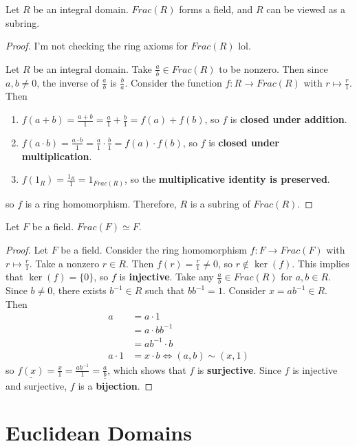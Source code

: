 \documentclass [12pt] {article}
\newenvironment{theorem}[1]{\begin{tcolorbox}[title={Theorem #1},colback=green!5!white,colframe=black!75!green]}{\end{tcolorbox}}
\newenvironment{corollary}[1]{\begin{tcolorbox}[title={Corollary #1}]}{\end{tcolorbox}}
\renewcommand{\bf}[1]{\textbf{{#1}}}
\newcommand{\ul}[1]{\underline{{#1}}}
\begin{document}
\begin{theorem}{}
    Let $R$ be an integral domain. $Frac(R)$ forms a field, and $R$ can be viewed as a subring.
\end{theorem}
\begin{proof}
    I'm not checking the ring axioms for $Frac(R)$ lol.
    \vspace{0.5em}

    Let $R$ be an integral domain. Take $\frac{a}{b} \in Frac(R)$ to be nonzero. Then since
    $a, b \neq 0$, the inverse of $\frac{a}{b}$ is $\frac{b}{a}$. Consider the function
    $f : R \to Frac(R)$ with $r \mapsto \frac{r}{1}$. Then
    \begin{enumerate}[label=(\arabic*)]
        \item $f(a + b) = \frac{a + b}{1} = \frac{a}{1} + \frac{b}{1} = f(a) + f(b)$, so $f$ is
            \bf{closed under addition}.
        \item $f(a \cdot b) = \frac{a \cdot b}{1} = \frac{a}{1} \cdot \frac{b}{1} = f(a) \cdot f(b)$,
            so $f$ is \bf{closed under multiplication}.
        \item $f(1_R) = \frac{1_R}{1} = 1_{Frac(R)}$, so the \bf{multiplicative identity is preserved}.
    \end{enumerate}
    so $f$ is a ring homomorphism. Therefore, $R$ is a subring of $Frac(R)$.
\end{proof}

\begin{corollary}{}
    Let $F$ be a field. $Frac(F) \simeq F$.
\end{corollary}
\begin{proof}
    Let $F$ be a field. Consider the ring homomorphism $f : F \to Frac(F)$ with $r \mapsto \frac{r}{1}$.
    Take a nonzero $r \in R$. Then $f(r) = \frac{r}{1} \neq 0$, so
    $r \not \in \ker(f)$. This implies that $\ker(f) = \{ 0 \}$, so $f$ is \bf{injective}. Take any
    $\frac{a}{b} \in Frac(R)$ for $a, b \in R$. Since $b \neq 0$, there exists $b^{-1} \in R$ such
    that $bb^{-1} = 1$. Consider $x = ab^{-1} \in R$. Then
    \begin{align*}
        a &= a \cdot 1 \\
          &= a \cdot bb^{-1} \\
          &= ab^{-1} \cdot b \\
        a \cdot 1 &= x \cdot b \iff (a, b) \sim (x, 1)
    \end{align*}
    so $\ul{f(x)} = \frac{x}{1} = \frac{ab^{-1}}{1} = \ul{\frac{a}{b}}$, which shows that $f$ is
    \bf{surjective}. Since $f$ is injective and surjective, $f$ is a \bf{bijection}.
\end{proof}

\section{Euclidean Domains}
\end{document}
